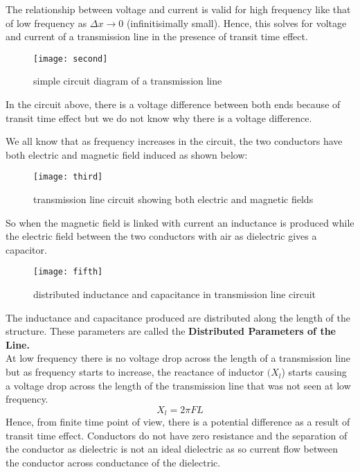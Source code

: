 	The relationship between voltage and current is valid for high frequency like that of low frequency as $ \Delta x  \rightarrow 0$ (infinitisimally small). Hence, this solves for voltage and current of a transmission line in the presence of transit time effect.\\
\begin{figure}[h]
	\centering
	\texttt{[image: second]}
	\caption{simple circuit diagram of a transmission line}
\end{figure}	

In the circuit above, there is a voltage difference between both ends because of transit time effect but we do not know why there is a voltage difference.

	We all know that as frequency increases in the circuit, the two conductors have both electric and magnetic field induced as shown below: 
	
	\begin{figure}[h]
		\centering
		\texttt{[image: third]}
		\caption{transmission line circuit showing both electric and magnetic fields}
	\end{figure}
	 	 So when the magnetic field is linked with current an inductance is produced while the electric field between the two conductors with air as dielectric gives a capacitor.
	
	\begin{figure}[h]
	\centering
	\texttt{[image: fifth]}
	\caption{distributed inductance and capacitance in transmission line circuit}
\end{figure}
	The inductance and capacitance produced are distributed along the length of the structure. These parameters are called the \textbf{Distributed Parameters of the Line.} 
	\\

	
	At low frequency there is no voltage drop across the length of a transmission line but as frequency starts to increase, the reactance of inductor $ (X_{l} $) starts causing a voltage drop across the length of the transmission line that was not seen at low frequency.
\[ 	X_{l} = 2 \pi FL \]
	Hence, from finite time point of view, there is a potential difference as a result of transit time effect. Conductors do not have zero resistance and the separation of the conductor as dielectric is not an ideal dielectric as so current flow between the conductor across conductance of the dielectric.\\
	
